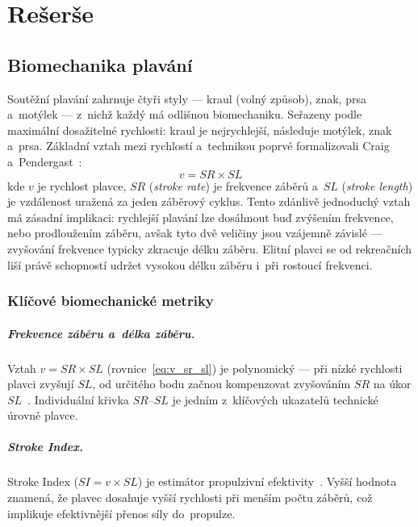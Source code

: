 \chapter{Rešerše}
\label{ch:reserse}

\section{Biomechanika plavání}
\label{sec:biomechanika}

Soutěžní plavání zahrnuje čtyři styly --- kraul (volný způsob), znak, prsa a~motýlek --- z~nichž každý má odlišnou biomechaniku. Seřazeny podle maximální dosažitelné rychlosti: kraul je nejrychlejší, následuje motýlek, znak a~prsa. Základní vztah mezi rychlostí a~technikou poprvé formalizovali Craig a~Pendergast~\cite{craig1979}:
\begin{equation}
    v = SR \times SL
    \label{eq:v_sr_sl}
\end{equation}
kde $v$ je rychlost plavce, $SR$ (\textit{stroke rate}) je frekvence záběrů a~$SL$ (\textit{stroke length}) je vzdálenost uražená za jeden záběrový cyklus. Tento zdánlivě jednoduchý vztah má zásadní implikaci: rychlejší plavání lze dosáhnout buď zvýšením frekvence, nebo prodloužením záběru, avšak tyto dvě veličiny jsou vzájemně závislé --- zvyšování frekvence typicky zkracuje délku záběru. Elitní plavci se od rekreačních liší právě schopností udržet vysokou délku záběru i~při rostoucí frekvenci.

\subsection{Klíčové biomechanické metriky}
\label{subsec:metriky}

\paragraph{Frekvence záběru a~délka záběru.}
Vztah $v = SR \times SL$ (rovnice~\ref{eq:v_sr_sl}) je polynomický --- při nízké rychlosti plavci zvyšují $SL$, od určitého bodu začnou kompenzovat zvyšováním $SR$ na úkor $SL$~\cite{craig1979}. Individuální křivka $SR$--$SL$ je jedním z~klíčových ukazatelů technické úrovně plavce.

\paragraph{Stroke Index.}
Stroke Index ($SI = v \times SL$) je estimátor propulzivní efektivity~\cite{barbosa2011}. Vyšší hodnota znamená, že plavec dosahuje vyšší rychlosti při menším počtu záběrů, což implikuje efektivnější přenos síly do~propulze.

